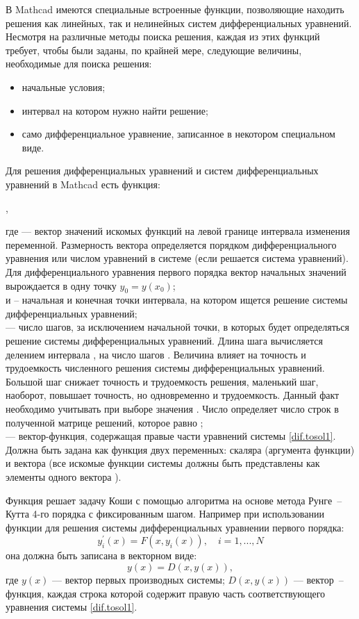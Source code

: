 В Mathcad имеются специальные встроенные функции, позволяющие находить решения как линейных, так и нелинейных систем дифференциальных уравнений. Несмотря на различные методы поиска решения, каждая из этих функций требует, чтобы были заданы, по крайней мере, следующие величины, необходимые для поиска решения:
\begin{itemize}
	\item начальные условия; 
	\item интервал на котором нужно найти решение;
	\item само дифференциальное уравнение, записанное в некотором специальном виде.
\end{itemize}

Для решения дифференциальных уравнений и систем дифференциальных уравнений в Mathcad есть функция:
\begin{center}
 ,
\end{center}
где  --- вектор значений искомых функций на левой границе интервала изменения переменной. Размерность вектора определяется порядком дифференциального уравнения или числом уравнений в системе (если решается система уравнений). Для дифференциального уравнения первого порядка вектор начальных значений вырождается в одну точку $y_0 = y(x_0)$;\\
 и  – начальная и конечная точки интервала, на котором ищется решение системы дифференциальных уравнений;\\
  --- число шагов, за исключением начальной точки, в которых будет определяться решение системы дифференциальных уравнений. Длина шага вычисляется делением интервала , на число шагов . Величина  влияет на точность и трудоемкость численного решения системы дифференциальных уравнений. Большой шаг снижает точность и трудоемкость решения, маленький шаг, наоборот, повышает точность, но одновременно и трудоемкость. Данный факт необходимо учитывать при выборе значения . Число  определяет число строк в полученной матрице решений, которое равно ;\\
 --- вектор-функция, содержащая правые части уравнений системы \ref{dif.tosol1}. Должна быть задана как функция двух переменных: скаляра  (аргумента функции) и вектора  (все искомые функции системы должны быть представлены как элементы одного вектора ).

  Функция  решает задачу Коши с помощью алгоритма на основе метода Рунге~-- Кутта 4-го порядка с фиксированным шагом.
Например при использовании функции  для решения системы дифференциальных уравнении первого порядка:
\begin{equation}\label{dif.tosol1}
y_i^{\prime}(x)=F(x,y_i(x)),\quad i=1, ... ,N
\end{equation}
она должна быть записана в векторном виде:
\begin{equation}\label{dif.tosol2}
y(x)=D(x,y(x)),
\end{equation}
где $y(x)$ --- вектор первых производных системы; $D(x,y(x))$ --- вектор~-- функция, каждая строка которой содержит правую часть соответствующего уравнения системы \ref{dif.tosol1}.

